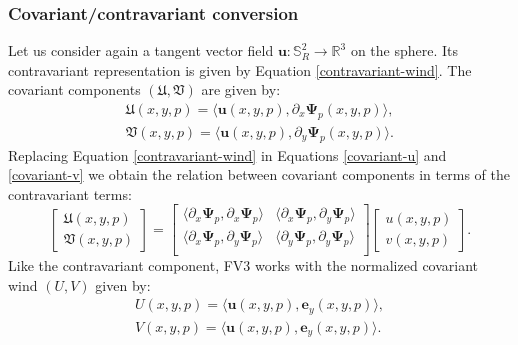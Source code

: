 \subsubsection{Covariant/contravariant conversion}
\label{anexo-cov-con}
Let us consider again a tangent vector field $\boldsymbol{u}: \mathbb{S}^2_R \to 
\mathbb{R}^3$ on the sphere. Its contravariant representation 
is given by Equation \eqref{contravariant-wind}.
The covariant components $(\mathfrak{U},\mathfrak{V})$ are given by:
\begin{align}
	\label{covariant-u}
	\mathfrak{U}(x,y,p) = \langle \boldsymbol{u}(x,y,p) , 	\partial_x\boldsymbol{\Psi}_p(x,y,p)  \rangle, \\
	\label{covariant-v}
	\mathfrak{V}(x,y,p) = \langle \boldsymbol{u}(x,y,p) , 	\partial_y\boldsymbol{\Psi}_p(x,y,p)  \rangle.
\end{align}
Replacing Equation \eqref{contravariant-wind} in 
Equations \eqref{covariant-u} and \eqref{covariant-v} we obtain
the relation between covariant components in terms of the
contravariant terms:
\begin{equation}
	\label{contravariant-to-covariant}
	\begin{bmatrix}
		\mathfrak{U}(x,y,p) \\
		\mathfrak{V}(x,y,p)
	\end{bmatrix}
	=
	\begin{bmatrix}
		\langle 	\partial_x\boldsymbol{\Psi}_p, \partial_x\boldsymbol{\Psi}_p \rangle
		& \langle 	\partial_x\boldsymbol{\Psi}_p, \partial_y\boldsymbol{\Psi}_p \rangle \\
		\langle 	\partial_x\boldsymbol{\Psi}_p, \partial_y\boldsymbol{\Psi}_p \rangle 
		& \langle   \partial_y\boldsymbol{\Psi}_p, \partial_y\boldsymbol{\Psi}_p \rangle \\
	\end{bmatrix}
	\begin{bmatrix}
		{u} (x,y,p) \\
		{v} (x,y,p) 
	\end{bmatrix}.
\end{equation}
Like the contravariant component, FV3 works with the normalized covariant wind $({U},{V})$ given by:
\begin{align}
	\label{norm-covariant-u}
	{U}(x,y,p) = \langle \boldsymbol{u}(x,y,p) , \boldsymbol{e}_y(x,y,p)  \rangle, \\
	\label{norm-covariant-v}
	{V}(x,y,p) = \langle \boldsymbol{u}(x,y,p) , \boldsymbol{e}_y(x,y,p)  \rangle.
\end{align}
